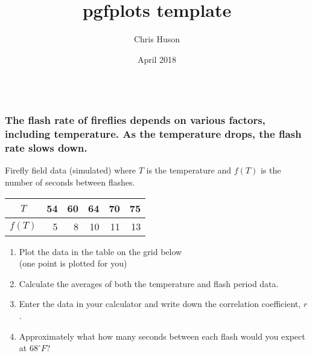\documentclass[12pt, oneside]{article}
\title{pgfplots template}
\author{Chris Huson}
\date{April 2018}
\begin{document}
\subsubsection*{\\ \textnormal{The flash rate of fireflies depends on various factors, including temperature. As the temperature drops, the flash rate slows down.
}}



Firefly field data (simulated) where $T$ is the temperature and $f(T)$ is the number of seconds between flashes. \\[10pt]
\begin{tabular}{|c|r|r|r|r|r|}
\hline 
$T$ & 54 & 60 & 64 & 70 & 75 \\ [3pt]
\hline 
$f(T)$ & 5 & 8 & 10 & 11 & 13  \\  [3pt]
\hline 
\end{tabular}
\begin{enumerate}
    \item Plot the data in the table on the grid below \\
    (one point is plotted for you)
    \item Calculate the averages of both the temperature and flash period data. \\[50pt]
    \item Enter the data in your calculator and write down the correlation coefficient, $r$. \\[20pt]
    \item Approximately what how many seconds between each flash would you expect at $68^\circ F$?
\end{enumerate}

\vspace{0.5in}
{}


\end{document}
